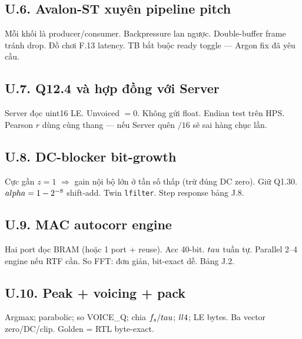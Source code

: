 \subsection*{U.6. Avalon-ST xuyên pipeline pitch}
Mỗi khối là producer/consumer. Backpressure lan ngược. Double-buffer frame tránh drop. Đồ chơi F.13 latency. TB bắt buộc ready toggle --- Argon fix đã yêu cầu.

\subsection*{U.7. Q12.4 và hợp đồng với Server}
Server đọc uint16 LE. Unvoiced $=0$. Không gửi float. Endian test trên HPS. Pearson $r$ dùng cùng thang --- nếu Server quên $/16$ sẽ sai hàng chục lần.

\subsection*{U.8. DC-blocker bit-growth}
Cực gần $z=1$ $\Rightarrow$ gain nội bộ lớn ở tần số thấp (trừ đúng DC zero). Giữ Q1.30. $\\alpha=1-2^{-8}$ shift-add. Twin \texttt{lfilter}. Step response bảng J.8.

\subsection*{U.9. MAC autocorr engine}
Hai port đọc BRAM (hoặc 1 port + reuse). Acc 40-bit. $\\tau$ tuần tự. Parallel 2--4 engine nếu RTF cần. So FFT: đơn giản, bit-exact dễ. Bảng J.2.

\subsection*{U.10. Peak + voicing + pack}
Argmax; parabolic; so VOICE\_Q; chia $f_s/\\tau$; $\\ll4$; LE bytes. Ba vector zero/DC/clip. Golden = RTL byte-exact.
